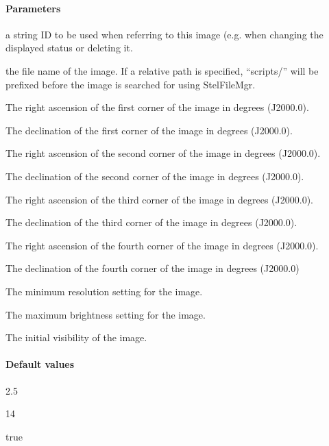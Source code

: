 \paragraph{Parameters}
\begin{description}[align=right,labelwidth=3cm,leftmargin=3.2cm]
\item[\parameter{id}] a string ID to be used when referring to this image (e.g. when changing the displayed status or deleting it.
\item[\parameter{filename}] the file name of the image. If a relative path is specified, ``scripts/'' will be prefixed before the image is searched for using StelFileMgr.
\item[\parameter{ra0}] The right ascension of the first corner of the image in degrees (J2000.0).
\item[\parameter{dec0}] The declination of the first corner of the image in degrees (J2000.0).
\item[\parameter{ra1}] The right ascension of the second corner of the image in degrees (J2000.0).
\item[\parameter{dec1}] 	The declination of the second corner of the image in degrees (J2000.0).
\item[\parameter{ra2}] The right ascension of the third corner of the image in degrees (J2000.0).
\item[\parameter{dec2}] The declination of the third corner of the image in degrees (J2000.0).
\item[\parameter{ra3}] The right ascension of the fourth corner of the image in degrees (J2000.0).
\item[\parameter{dec3}] The declination of the fourth corner of the image in degrees (J2000.0)
\item[\parameter{minRes}] The minimum resolution setting for the image.
\item[\parameter{maxBright}] The maximum brightness setting for the image.
\item[\parameter{visible}] The initial visibility of the image.
\end{description}

\paragraph{Default values}
\begin{description}[align=right,labelwidth=3cm,leftmargin=3.2cm]
\item[\parameter{minRes}] 2.5
\item[\parameter{maxBright}] 14
\item[\parameter{visible}] true
\end{description}

